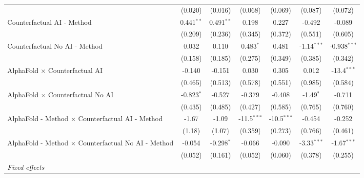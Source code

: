 \begin{tabular}{lcccccc}
                                                              & (0.020)      & (0.016)      & (0.068)       & (0.069)       & (0.087)       & (0.072)\\   
   Counterfactual AI - Method                                 & 0.441$^{**}$ & 0.491$^{**}$ & 0.198         & 0.227         & -0.492        & -0.089\\   
                                                              & (0.209)      & (0.236)      & (0.345)       & (0.372)       & (0.551)       & (0.605)\\   
   Counterfactual No AI - Method                              & 0.032        & 0.110        & 0.483$^{*}$   & 0.481         & -1.14$^{***}$ & -0.938$^{***}$\\   
                                                              & (0.158)      & (0.185)      & (0.275)       & (0.349)       & (0.385)       & (0.342)\\   
   AlphaFold $\times$ Counterfactual AI                       & -0.140       & -0.151       & 0.030         & 0.305         & 0.012         & -13.4$^{***}$\\   
                                                              & (0.465)      & (0.513)      & (0.578)       & (0.551)       & (0.985)       & (0.584)\\   
   AlphaFold $\times$ Counterfactual No AI                    & -0.823$^{*}$ & -0.527       & -0.379        & -0.408        & -1.49$^{*}$   & -0.711\\   
                                                              & (0.435)      & (0.485)      & (0.427)       & (0.585)       & (0.765)       & (0.760)\\   
   AlphaFold - Method $\times$ Counterfactual AI - Method     & -1.67        & -1.09        & -11.5$^{***}$ & -10.5$^{***}$ & -0.454        & -0.252\\   
                                                              & (1.18)       & (1.07)       & (0.359)       & (0.273)       & (0.766)       & (0.461)\\   
   AlphaFold - Method $\times$ Counterfactual No AI - Method  & -0.054       & -0.298$^{*}$ & -0.066        & -0.090        & -3.33$^{***}$ & -1.67$^{***}$\\   
                                                              & (0.052)      & (0.161)      & (0.052)       & (0.060)       & (0.378)       & (0.255)\\   
   \midrule
   \emph{Fixed-effects}\\

\end{tabular}

